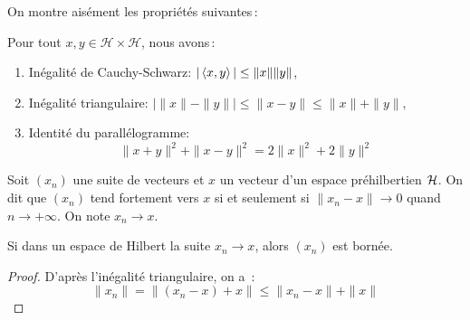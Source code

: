 On montre ais\'{e}ment les propri\'{e}t\'{e}s suivantes\,:
\begin{theorem}

\label{theo:cauchyandco}
 Pour tout $x,y \in \mathcal{H}\times
\mathcal{H}$, nous avons\,:
\begin{enumerate}[label=\emph{\alph*})]
   \item In\'{e}galit\'{e} de Cauchy-Schwarz:
     $|\left\langle x, y \right\rangle| \leq \|x\| \|y\|$,
   \item In\'{e}galit\'{e} triangulaire:
 $\left | \|x\|-\|y\| \right |\leq \| x - y \| \leq \| x \| + \| y\|$,
   \item Identit\'{e} du parall\'{e}logramme:
\[
\| x + y \|^2 + \| x-y\|^2 = 2 \|x\|^2 + 2 \|y\|^2
\]
\end{enumerate}
\end{theorem}
\begin{definition}
Soit $(x_n)$ une suite de vecteurs  et $x$ un vecteur d'un espace
pr\'{e}hilbertien $\mathcal{H}$. On dit que $(x_n)$ tend fortement
vers $x$ si et seulement si $\|x_n-x\| \rightarrow 0$ quand
$n\rightarrow +\infty$. On note $x_n \rightarrow x$.
\end{definition}
\begin{proposition}
\label{prop:cvgceforte-implique-borne}
Si dans un espace de Hilbert la suite $x_n\rightarrow x$, alors
$(x_n)$ est born\'{e}e.
\end{proposition}
\begin{proof}\smartqed
D'apr\`{e}s l'in\'{e}galit\'{e} triangulaire, on a~:
$$
 \|x_n\|=\|(x_n-x)+x\|\leq \|x_n-x\|+\|x\|
$$

\end{proof}

